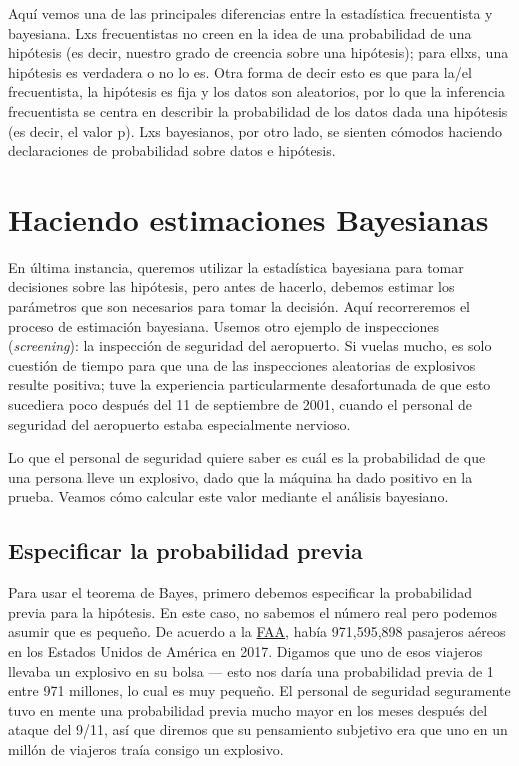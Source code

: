 \documentclass[
  12pt,
]{book}
\begin{document}
Aquí vemos una de las principales diferencias entre la estadística frecuentista y bayesiana. Lxs frecuentistas no creen en la idea de una probabilidad de una hipótesis (es decir, nuestro grado de creencia sobre una hipótesis); para ellxs, una hipótesis es verdadera o no lo es. Otra forma de decir esto es que para la/el frecuentista, la hipótesis es fija y los datos son aleatorios, por lo que la inferencia frecuentista se centra en describir la probabilidad de los datos dada una hipótesis (es decir, el valor p). Lxs bayesianos, por otro lado, se sienten cómodos haciendo declaraciones de probabilidad sobre datos e hipótesis.

\hypertarget{doing-bayesian-estimation}{%
\section{Haciendo estimaciones Bayesianas}\label{doing-bayesian-estimation}}

En última instancia, queremos utilizar la estadística bayesiana para tomar decisiones sobre las hipótesis, pero antes de hacerlo, debemos estimar los parámetros que son necesarios para tomar la decisión. Aquí recorreremos el proceso de estimación bayesiana. Usemos otro ejemplo de inspecciones (\emph{screening}): la inspección de seguridad del aeropuerto. Si vuelas mucho, es solo cuestión de tiempo para que una de las inspecciones aleatorias de explosivos resulte positiva; tuve la experiencia particularmente desafortunada de que esto sucediera poco después del 11 de septiembre de 2001, cuando el personal de seguridad del aeropuerto estaba especialmente nervioso.

Lo que el personal de seguridad quiere saber es cuál es la probabilidad de que una persona lleve un explosivo, dado que la máquina ha dado positivo en la prueba. Veamos cómo calcular este valor mediante el análisis bayesiano.

\hypertarget{especificar-la-probabilidad-previa}{%
\subsection{Especificar la probabilidad previa}\label{especificar-la-probabilidad-previa}}

Para usar el teorema de Bayes, primero debemos especificar la probabilidad previa para la hipótesis. En este caso, no sabemos el número real pero podemos asumir que es pequeño. De acuerdo a la \href{https://www.faa.gov/air_traffic/by_the_numbers/media/Air_Traffic_by_the_Numbers_2018.pdf}{FAA}, había 971,595,898 pasajeros aéreos en los Estados Unidos de América en 2017. Digamos que uno de esos viajeros llevaba un explosivo en su bolsa --- esto nos daría una probabilidad previa de 1 entre 971 millones, lo cual es muy pequeño. El personal de seguridad seguramente tuvo en mente una probabilidad previa mucho mayor en los meses después del ataque del 9/11, así que diremos que su pensamiento subjetivo era que uno en un millón de viajeros traía consigo un explosivo.
\end{document}
